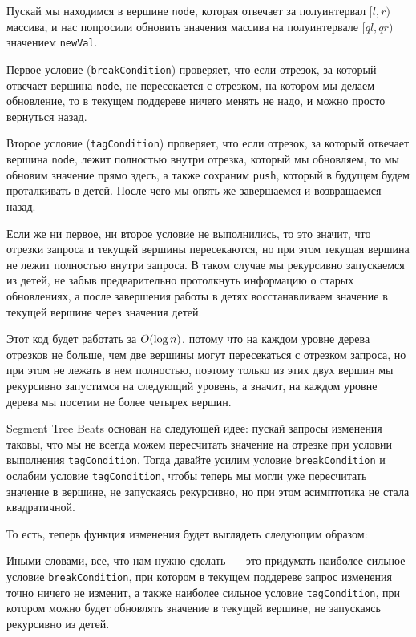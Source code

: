

Пускай мы находимся в вершине \verb+node+, которая отвечает за полуинтервал $[l, r)$ массива, и нас попросили обновить значения массива на полуинтервале $[ql, qr)$ значением \verb+newVal+.

Первое условие (\verb+breakCondition+) проверяет, что если отрезок, за который отвечает вершина \verb+node+, не пересекается с отрезком, на котором мы делаем обновление, то в текущем поддереве ничего менять не надо, и можно просто вернуться назад.

Второе условие (\verb+tagCondition+) проверяет, что если отрезок, за который отвечает вершина \verb+node+, лежит полностью внутри отрезка, который мы обновляем, то мы обновим значение прямо здесь, а также сохраним \verb+push+, который в будущем будем проталкивать в детей. После чего мы опять же завершаемся и возвращаемся назад.

Если же ни первое, ни второе условие не выполнились, то это значит, что отрезки запроса и текущей вершины пересекаются, но при этом текущая вершина не лежит полностью внутри запроса. В таком случае мы рекурсивно запускаемся из детей, не забыв предварительно протолкнуть информацию о старых обновлениях, а после завершения работы в детях восстанавливаем значение в текущей вершине через значения детей.

Этот код будет работать за $O(\log n)$, потому что на каждом уровне дерева отрезков не больше, чем две вершины могут пересекаться с отрезком запроса, но при этом не лежать в нем полностью, поэтому только из этих двух вершин мы рекурсивно запустимся на следующий уровень, а значит, на каждом уровне дерева мы посетим не более четырех вершин.

Segment Tree Beats основан на следующей идее: пускай запросы изменения таковы, что мы не всегда можем пересчитать значение на отрезке при условии выполнения \verb+tagCondition+. Тогда давайте усилим условие \verb+breakCondition+ и ослабим условие \verb+tagCondition+, чтобы теперь мы могли уже пересчитать значение в вершине, не запускаясь рекурсивно, но при этом асимптотика не стала квадратичной.

То есть, теперь функция изменения будет выглядеть следующим образом:



Иными словами, все, что нам нужно сделать~--- это придумать наиболее сильное условие \verb+breakCondition+, при котором в текущем поддереве запрос изменения точно ничего не изменит, а также наиболее сильное условие \verb+tagCondition+, при котором можно будет обновлять значение в текущей вершине, не запускаясь рекурсивно из детей.

